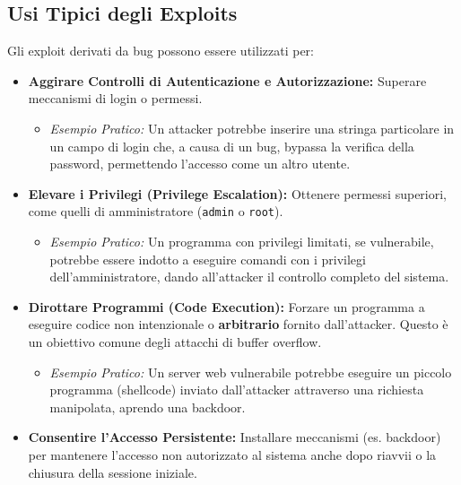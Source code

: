 \documentclass{article}
\begin{document}
\subsection{Usi Tipici degli Exploits}
Gli exploit derivati da bug possono essere utilizzati per:
\begin{itemize}
    \item \textbf{Aggirare Controlli di Autenticazione e Autorizzazione:}
    Superare meccanismi di login o permessi.
    \begin{itemize}
        \item \textit{Esempio Pratico:} Un attacker potrebbe inserire una stringa particolare in un campo di login che, a causa di un bug, bypassa la verifica della password, permettendo l'accesso come un altro utente.
    \end{itemize}

    \item \textbf{Elevare i Privilegi (Privilege Escalation):}
    Ottenere permessi superiori, come quelli di amministratore (\texttt{admin} o \texttt{root}).
    \begin{itemize}
        \item \textit{Esempio Pratico:} Un programma con privilegi limitati, se vulnerabile, potrebbe essere indotto a eseguire comandi con i privilegi dell'amministratore, dando all'attacker il controllo completo del sistema.
    \end{itemize}

    \item \textbf{Dirottare Programmi (Code Execution):}
    Forzare un programma a eseguire codice non intenzionale o \textbf{arbitrario} fornito dall'attacker. Questo è un obiettivo comune degli attacchi di buffer overflow.
    \begin{itemize}
        \item \textit{Esempio Pratico:} Un server web vulnerabile potrebbe eseguire un piccolo programma (shellcode) inviato dall'attacker attraverso una richiesta manipolata, aprendo una backdoor.
    \end{itemize}

    \item \textbf{Consentire l'Accesso Persistente:}
    Installare meccanismi (es. backdoor) per mantenere l'accesso non autorizzato al sistema anche dopo riavvii o la chiusura della sessione iniziale.
\end{itemize}
\end{document}
